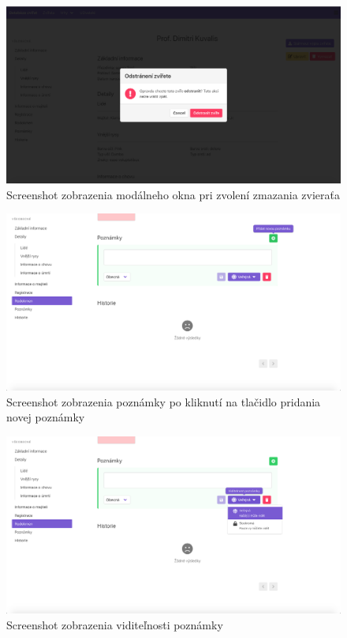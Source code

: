 \vspace*{\fill}

\begin{figure}[H]
	\includegraphics[width=1.0\textwidth]{media/priloha/zviera/editacia/8.png}
	\caption{Screenshot zobrazenia modálneho okna pri zvolení zmazania zvieraťa}
\end{figure}

\begin{figure}[H]
	\includegraphics[width=1.0\textwidth]{media/priloha/zviera/poznamka/1.png}
	\caption{Screenshot zobrazenia poznámky po kliknutí na tlačidlo pridania novej poznámky}
\end{figure}

\vspace*{\fill}

\begin{figure}[H]
	\includegraphics[width=1.0\textwidth]{media/priloha/zviera/poznamka/2.png}
	\caption{Screenshot zobrazenia viditeľnosti poznámky}
\end{figure}

